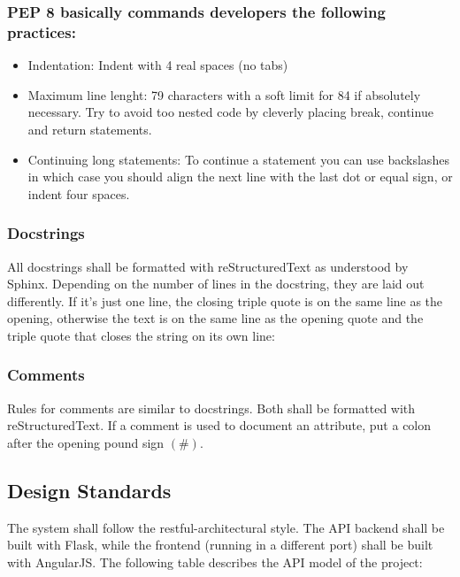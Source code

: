 \documentclass[12pt,letterpaper, margin=1in]{article}
\begin{document}
\subsubsection{PEP 8 basically commands developers the following practices: }
\begin{itemize}
\item Indentation: Indent with 4 real spaces (no tabs)
\item Maximum line lenght: 79 characters with a soft limit for 84 if absolutely necessary. Try to avoid too nested code by cleverly placing break, continue and return statements.
\item Continuing long statements: To continue a statement you can use backslashes in which case you should align the next line with the last dot or equal sign, or indent four spaces.
\end{itemize}

\subsubsection{Docstrings}
All docstrings shall be formatted with reStructuredText as understood by Sphinx. Depending on the number of lines in the docstring, they are laid out differently. If it’s just one line, the closing triple quote is on the same line as the opening, otherwise the text is on the same line as the opening quote and the triple quote that closes the string on its own line:

\subsubsection{Comments}
Rules for comments are similar to docstrings. Both shall be formatted with reStructuredText. If a comment is used to document an attribute, put a colon after the opening pound sign $(\#)$. 

\subsection{Design Standards}

The system shall follow the restful-architectural style. The API backend shall be built with Flask, while the frontend (running in a different port) shall be built with AngularJS. The following table describes the API model of the project: 
\end{document}
